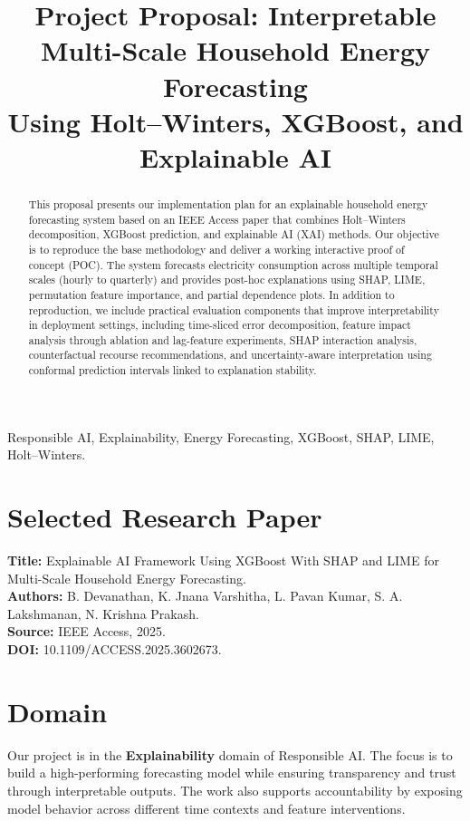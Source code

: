 \documentclass[conference]{IEEEtran}
\title{Project Proposal: Interpretable Multi-Scale Household Energy Forecasting\\
Using Holt--Winters, XGBoost, and Explainable AI}
\author{
\IEEEauthorblockN{Manal Aamir, Arhum Khan}
\IEEEauthorblockA{Course: Responsible AI\\
Department: Data Science\\
Base Paper Source: IEEE Access, 2025 (DOI: 10.1109/ACCESS.2025.3602673)}
}
\begin{document}
\maketitle

\begin{abstract}
This proposal presents our implementation plan for an explainable household energy forecasting system based on an IEEE Access paper that combines Holt--Winters decomposition, XGBoost prediction, and explainable AI (XAI) methods. Our objective is to reproduce the base methodology and deliver a working interactive proof of concept (POC). The system forecasts electricity consumption across multiple temporal scales (hourly to quarterly) and provides post-hoc explanations using SHAP, LIME, permutation feature importance, and partial dependence plots. In addition to reproduction, we include practical evaluation components that improve interpretability in deployment settings, including time-sliced error decomposition, feature impact analysis through ablation and lag-feature experiments, SHAP interaction analysis, counterfactual recourse recommendations, and uncertainty-aware interpretation using conformal prediction intervals linked to explanation stability.
\end{abstract}

\begin{IEEEkeywords}
Responsible AI, Explainability, Energy Forecasting, XGBoost, SHAP, LIME, Holt--Winters.
\end{IEEEkeywords}

\section{Selected Research Paper}
\textbf{Title:} Explainable AI Framework Using XGBoost With SHAP and LIME for Multi-Scale Household Energy Forecasting.\\
\textbf{Authors:} B. Devanathan, K. Jnana Varshitha, L. Pavan Kumar, S. A. Lakshmanan, N. Krishna Prakash.\\
\textbf{Source:} IEEE Access, 2025.\\
\textbf{DOI:} 10.1109/ACCESS.2025.3602673.

\section{Domain}
Our project is in the \textbf{Explainability} domain of Responsible AI. The focus is to build a high-performing forecasting model while ensuring transparency and trust through interpretable outputs. The work also supports accountability by exposing model behavior across different time contexts and feature interventions.
\end{document}
